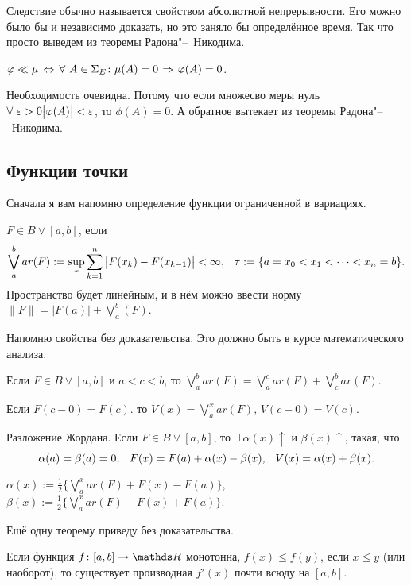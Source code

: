 Следствие обычно называется свойством абсолютной непрерывности. Его можно было бы и независимо доказать, но это заняло бы определённое время. Так что просто выведем из теоремы Радона"--~Никодима.
\begin{Sl}
  $\varphi\ll\mu\,\Leftrightarrow\, \forall\ A\in\Sigma_E\colon \mu(A)=0\hspace{1pt plus1pt}\Rightarrow\hspace{1pt plus1pt} \varphi(A)=0$.
\end{Sl}
\begin{Proof}
  Необходимость очевидна. Потому что если множесво меры нуль $\forall\ \varepsilon>0\big|\varphi(A)\big|<\varepsilon$, то $\phi(A)=0$. А обратное вытекает из теоремы Радона"--~Никодима.
\end{Proof}

\subsection{Функции точки}
Сначала я вам напомню определение функции ограниченной в вариациях.
\begin{Def}
  $F\in B\vee[a,b]$, если
\[
  \bigvee\limits_a^bar(F):=\sup\limits_\tau\sum\limits_{k = 1}^{n}\big|F(x_k)-F(x_{k-1})\big|<\infty,\hskip .75em plus.1em minus.08em\relax \tau:=\{a=x_0<x_1<\dots<x_n=b\}.
\]
Пространство будет линейным, и в нём можно ввести норму $\| F\| = \big|F(a)\big|+\bigvee\limits_a^b(F)$.
\end{Def}

Напомню свойства без доказательства. Это должно быть в курсе математического анализа.
\begin{Ut}
  Если $F\in B\vee[a,b]$ и $a<c<b$, то $\bigvee\limits_a^bar(F) = \bigvee\limits_a^car(F)+\bigvee\limits_c^bar(F)$.
\end{Ut}
\begin{Ut}
  Если $F(c-0) = F(c)$. то $V(x)=\bigvee\limits_a^xar(F)$, $V(c-0)=V(c)$.
\end{Ut}
\begin{Ut}
  Разложение Жордана. Если $F\in B\vee [a,b]$, то $\exists\ \alpha(x)\uparrow$ и $\beta(x)\uparrow$, такая, что
\[
  \alpha(a)=\beta(a)=0,\hskip .75em plus.1em minus.08em\relax F(x) = F(a)+\alpha(x)-\beta(x),\hskip .75em plus.1em minus.08em\relax V(x) = \alpha(x)+\beta(x).
\]
\end{Ut}
\begin{Proof}
  $\alpha(x):=\frac12\big\{ \bigvee_a^xar(F)+F(x)-F(a)\big\}$, $\beta(x):=\frac12\big\{\bigvee_a^xar(F)-F(x)+F(a)\big\}$.
\end{Proof}

Ещё одну теорему приведу без доказательства.
\begin{The}
  Если функция $f\colon [a,b]\to\R$ монотонна, $f(x)\le f(y)$, если $x\le y$ (или наоборот), то существует производная $f'(x)$ почти всюду на $[a,b]$.
\end{The}

